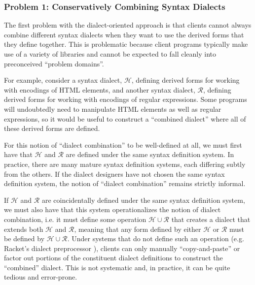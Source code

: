 \subsubsection{Problem 1: Conservatively Combining Syntax Dialects}
The first problem with the dialect-oriented approach is that clients  cannot always combine different syntax dialects when they want to use the derived forms that they define together. This is problematic because client programs typically make use of a variety of libraries and cannot be expected to fall cleanly into preconceived ``problem domains''.

For example, consider a syntax dialect, $\mathcal{H}$, defining derived forms for working with encodings of HTML elements, and another syntax dialect, $\mathcal{R}$,  defining derived forms for working with encodings of regular expressions. Some programs will undoubtedly need to manipulate HTML elements as well as regular expressions, so it would be useful to construct a ``combined dialect'' where all of these derived forms are defined. 

For this notion of ``dialect combination'' to be well-defined at all, we must first have that $\mathcal{H}$ and $\mathcal{R}$ are defined under the same syntax definition system. In practice, there are many mature syntax definition systems, each differing subtly from the others. If the dialect designers  have not  chosen the same syntax definition system, the notion of ``dialect combination'' remains strictly informal.%

If $\mathcal{H}$ and $\mathcal{R}$ are coincidentally defined under the same syntax definition system, we must also have that this system operationalizes the notion of dialect combination, i.e. it must define some operation $\mathcal{H} \cup \mathcal{R}$ that creates a dialect that extends both $\mathcal{H}$ and $\mathcal{R}$, meaning that any form defined by either $\mathcal{H}$ or $\mathcal{R}$ must be defined by $\mathcal{H} \cup \mathcal{R}$. Under systems that do not define such an operation (e.g. Racket's dialect preprocessor \cite{Flatt:2012:CLR:2063176.2063195}), clients can only manually  ``copy-and-paste'' or factor out portions of the constituent dialect definitions to construct the ``combined'' dialect. This is not systematic and, in practice, it can be quite tedious and error-prone. %

